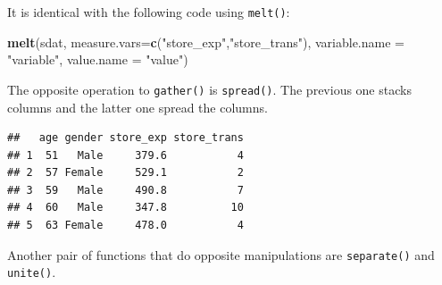 \documentclass[12pt,]{krantz}
\newenvironment{Shaded}{\begin{snugshade}}{\end{snugshade}}
\newcommand{\KeywordTok}[1]{\textcolor[rgb]{0.13,0.29,0.53}{\textbf{{#1}}}}
\newcommand{\DataTypeTok}[1]{\textcolor[rgb]{0.13,0.29,0.53}{{#1}}}
\newcommand{\StringTok}[1]{\textcolor[rgb]{0.31,0.60,0.02}{{#1}}}
\newcommand{\NormalTok}[1]{{#1}}
\theoremstyle{definition}
\theoremstyle{definition}
\theoremstyle{remark}
\begin{document}
\begin{Shaded}
\end{Shaded}

It is identical with the following code using \texttt{melt()}:

\begin{Shaded}
\begin{Highlighting}[]
\KeywordTok{melt}\NormalTok{(sdat, }\DataTypeTok{measure.vars=}\KeywordTok{c}\NormalTok{(}\StringTok{"store_exp"}\NormalTok{,}\StringTok{"store_trans"}\NormalTok{),}
            \DataTypeTok{variable.name =} \StringTok{"variable"}\NormalTok{,}
              \DataTypeTok{value.name =} \StringTok{"value"}\NormalTok{)}
\end{Highlighting}
\end{Shaded}

The opposite operation to \texttt{gather()} is \texttt{spread()}. The
previous one stacks columns and the latter one spread the columns.

\begin{Shaded}
\end{Shaded}

\begin{verbatim}
##   age gender store_exp store_trans
## 1  51   Male     379.6           4
## 2  57 Female     529.1           2
## 3  59   Male     490.8           7
## 4  60   Male     347.8          10
## 5  63 Female     478.0           4
\end{verbatim}

Another pair of functions that do opposite manipulations are
\texttt{separate()} and \texttt{unite()}.

\begin{Shaded}
\end{Shaded}
\end{document}
